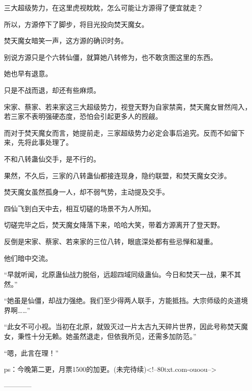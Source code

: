 \begin{this_body}
三大超级势力，在这里虎视眈眈，怎么可能让方源得了便宜就走？

所以，方源停下了脚步，将目光投向焚天魔女。

焚天魔女暗笑一声，这方源的确识时务。

别说方源只是个六转仙僵，就算她八转修为，也不敢贪图这里的东西。

她也早有退意。

只是不战而退，却还有些麻烦。

宋家、蔡家、若来家这三大超级势力，视登天野为自家禁脔，焚天魔女冒然闯入，若三家不表明强硬态度，恐怕会引起更多人的觊觎。

而对于焚天魔女而言，她提前走，三家超级势力必定会事后追究。反而不如留下来，先将此事处理了。

不和八转蛊仙交手，是不行的。

果然，不久后，三家的八转蛊仙都接连现身，隐约联盟，和焚天魔女交涉。

焚天魔女虽然孤身一人，却不弱气势，主动提及交手。

四仙飞到白天中去，相互切磋的场景不为人所知。

切磋完毕之后，焚天魔女降落下来，哈哈大笑，带着方源离开了登天野。

反倒是宋家、蔡家、若来家的三位八转，眼底深处都有些忌惮和凝重。

他们暗中交流。

“早就听闻，北原蛊仙战力脱俗，远超四域同级蛊仙。今日和焚天一战，果不其然。”

“她虽是仙僵，却战力强绝。我们至少得两人联手，方能抵挡。大宗师级的炎道境界啊……”

“此女不可小视。当初在北原，就毁灭过一片太古九天碎片世界，因此号称焚天魔女，秉性十分无赖。她虽然退走，但依我所见，还需多加防范。”

“嗯，此言在理！”

ps：今晚第二更，月票1500的加更。(未完待续)<!--80txt.com-ouoou-->

------------

\end{this_body}

